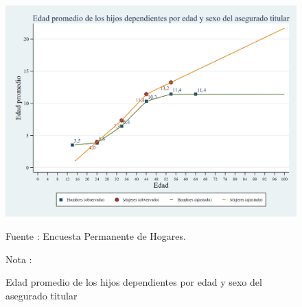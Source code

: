 \begin{figure}[H]
\begin{center}
                    \caption{Edad promedio de los hijos dependientes por edad y sexo del asegurado titular}
                    \includegraphics[scale=0.35]{EPH_familia_edad_prom_hijos.png}
                                    \item \footnotesize Fuente : Encuesta Permanente de Hogares.
                                    \item \footnotesize Nota : 
                    \end{center}
\end{figure}
